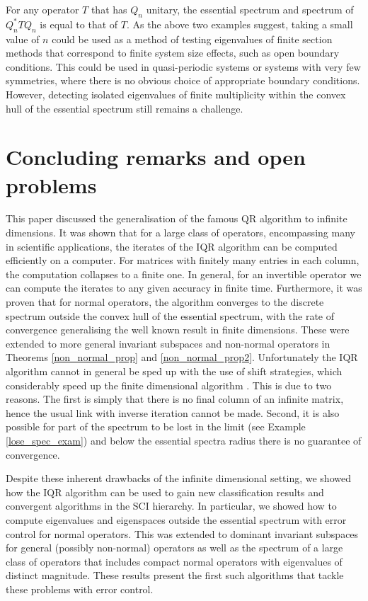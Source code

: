 \documentclass[a4paper,10pt]{article}
\begin{document}
\begin{remark}
For any operator $T$ that has $Q_n$ unitary, the essential spectrum and spectrum of $Q_n^*TQ_n$ is equal to that of $T$. As the above two examples suggest, taking a small value of $n$ could be used as a method of testing eigenvalues of finite section methods that correspond to finite system size effects, such as open boundary conditions. This could be used in quasi-periodic systems or systems with very few symmetries, where there is no obvious choice of appropriate boundary conditions. However, detecting isolated eigenvalues of finite multiplicity within the convex hull of the essential spectrum still remains a challenge.
\end{remark}

\section{Concluding remarks and open problems}
\label{conc_s}

This paper discussed the generalisation of the famous QR algorithm to infinite dimensions. It was shown that for a large class of operators, encompassing many in scientific applications, the iterates of the IQR algorithm can be computed efficiently on a computer. For matrices with finitely many entries in each column, the computation collapses to a finite one. In general, for an invertible operator we can compute the iterates to any given accuracy in finite time. Furthermore, it was proven that for normal operators, the algorithm converges to the discrete spectrum outside the convex hull of the essential spectrum, with the rate of convergence generalising the well known result in finite dimensions. These were extended to more general invariant subspaces and non-normal operators in Theorems \ref{non_normal_prop} and \ref{non_normal_prop2}. Unfortunately the IQR algorithm cannot in general be sped up with the use of shift strategies, which considerably speed up the finite dimensional algorithm \cite{parlett1998symmetric}. This is due to two reasons. The first is simply that there is no final column of an infinite matrix, hence the usual link with inverse iteration cannot be made. Second, it is also possible for part of the spectrum to be lost in the limit (see Example \ref{lose_spec_exam}) and below the essential spectra radius there is no guarantee of convergence. %

Despite these inherent drawbacks of the infinite dimensional setting, we showed how the IQR algorithm can be used to gain new classification results and convergent algorithms in the SCI hierarchy. In particular, we showed how to compute eigenvalues and eigenspaces outside the essential spectrum with error control for normal operators. This was extended to dominant invariant subspaces for general (possibly non-normal) operators as well as the spectrum of a large class of operators that includes compact normal operators with eigenvalues of distinct magnitude. These results present the first such algorithms that tackle these problems with error control.
\end{document}
